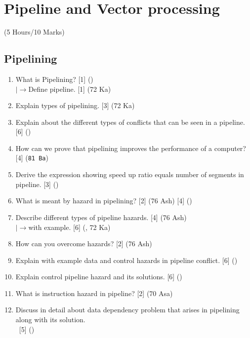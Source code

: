 \documentclass[12pt]{article}
\newcommand{\lb}{\\$\left|\rightarrow\right.$}
\newcommand{\enter}{\\\textcolor{white}{1}}
\begin{document}
	\pagebreak

\section{Pipeline and Vector processing}
	\begin{center}(5 Hours/10 Marks)\end{center}
	\subsection{Pipelining}
		\begin{enumerate}
			\item What is Pipelining? \hfill [1] ()
			\lb Define pipeline. \hfill [1] (72 Ka)

			\item Explain types of pipelining. \hfill [3] (72 Ka)

			\item Explain about the different types of conflicts that can be seen in a pipeline. \hfill [6] ()

			\item How can we prove that pipelining improves the performance of a computer? \hfill [4] (\texttt{81 Ba})

			\item Derive the expression showing speed up ratio equals number of segments in pipeline. \hfill [3] ()

			\item What is meant by hazard in pipelining? \hfill [2] (76 Ash) [4] ()

			\item Describe different types of pipeline hazards. \hfill [4] (76 Ash)
			\lb with example. \hfill [6] (, 72 Ka)

			\item How can you overcome hazards? \hfill [2] (76 Ash)

			\item Explain with example data and control hazards in pipeline conflict. \hfill [6] ()

			\item Explain control pipeline hazard and its solutions. \hfill [6] ()

			\item What is instruction hazard in pipeline? \hfill [2] (70 Asa)

			\item Discuss in detail about data dependency problem that arises in pipelining along with its solution.
			\enter\hfill [5] ()
		\end{enumerate}
\end{document}

